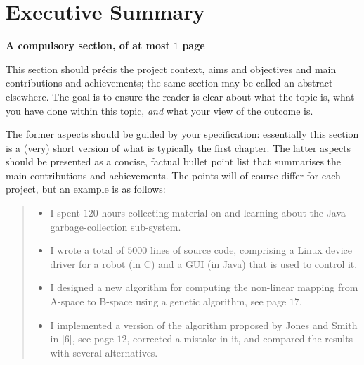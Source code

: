 \documentclass[ %
                    author={Luke Murray},
                supervisor={Dr. Simon Hollis},
                     title={Shadow Peer-to-Peer Networks},
                  subtitle={},
                    degree={MEng},
                      year={2013} ]{thesis}
\begin{document}

\makedecl


\tableofcontents
\listoffigures
\listoftables
\listofalgorithms
\lstlistoflistings



\chapter*{Executive Summary}

{\bf A compulsory section, of at most $1$ page} 
\vspace{1cm} 

\noindent
This section should pr\'{e}cis the project context, aims and objectives 
and main contributions and achievements; the same section may be called
an abstract elsewhere.  The goal is to ensure the reader is clear about 
what the topic is, what you have done within this topic, {\em and} what 
your view of the outcome is.

The former aspects should be guided by your specification: essentially 
this section is a (very) short version of what is typically the first 
chapter.  The latter aspects should be presented as a concise, factual 
bullet point list that summarises the main contributions and achievements.  
The points will of course differ for each project, but an example is as 
follows:

\begin{quote}
\noindent
\begin{itemize}
\item I spent $120$ hours collecting material on and learning about the 
      Java garbage-collection sub-system. 
\item I wrote a total of $5000$ lines of source code, comprising a Linux 
      device driver for a robot (in C) and a GUI (in Java) that is 
      used to control it.
\item I designed a new algorithm for computing the non-linear mapping 
      from A-space to B-space using a genetic algorithm, see page $17$.
\item I implemented a version of the algorithm proposed by Jones and 
      Smith in [6], see page $12$, corrected a mistake in it, and 
      compared the results with several alternatives.
\end{itemize}
\end{quote}
\end{document}
